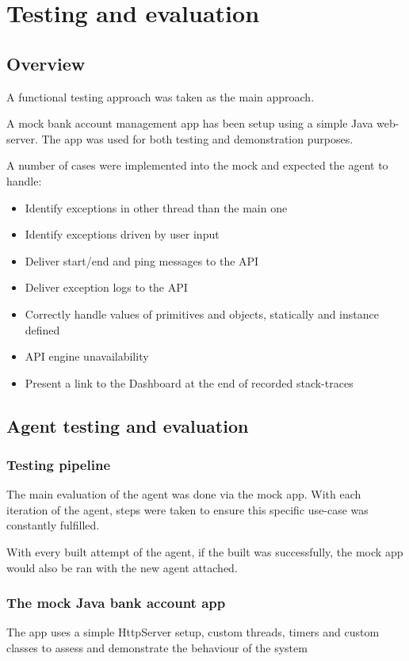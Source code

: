 \section{Testing and evaluation}
\subsection{Overview}
A functional testing approach was taken as the main approach. 

A mock bank account management app has been setup using a simple Java web-server. The app was used for both testing and demonstration purposes.

A number of cases were implemented into the mock and expected the agent to handle:

\begin{itemize}
  \item Identify exceptions in other thread than the main one
  \item Identify exceptions driven by user input
  \item Deliver start/end and ping messages to the API
  \item Deliver exception logs to the API
  \item Correctly handle values of primitives and objects, statically and instance defined
  \item API engine unavailability
  \item Present a link to the Dashboard at the end of recorded stack-traces
\end{itemize}

\subsection{Agent testing and evaluation}
\subsubsection{Testing pipeline}
The main evaluation of the agent was done via the mock app. With each iteration of the agent, steps were taken to ensure this specific use-case was constantly fulfilled.

With every built attempt of the agent, if the built was successfully, the mock app would also be ran with the new agent attached.

\subsubsection{The mock Java bank account app}
The app uses a simple HttpServer setup, custom threads, timers and custom classes to assess and demonstrate the behaviour of the system

